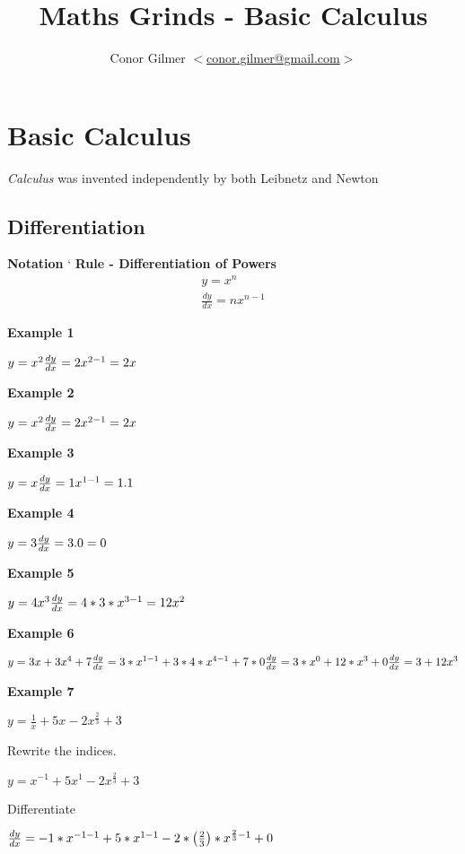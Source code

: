 \documentclass{article}
\title{\gmat{} Maths Grinds - Basic Calculus}
\author{Conor Gilmer $<$\href{mailto:conor.gilmer@gmail.com}{conor.gilmer@gmail.com}$>$}
\begin{document}
\section{Basic Calculus}
\textit{Calculus} was invented independently by both Leibnetz and Newton
\subsection{Differentiation}
\textbf{Notation}
`
\textbf{Rule - Differentiation of Powers}
\begin{equation}
\begin{split}
y = x^{n} \\
\frac{dy}{dx} = nx^{n-1}
\end{split}
\end{equation}




\textbf{Example 1}

$y = x^{2}\\
\frac{dy}{dx} = 2x^{2-1} = 2x
$


\textbf{Example 2}

$y = x^{2}\\
\frac{dy}{dx} = 2x^{2-1} = 2x
$


\textbf{Example 3}

$y = x\\
\frac{dy}{dx} = 1x^{1-1} = 1.1
$

\textbf{Example 4}

$y = 3\\
\frac{dy}{dx} = 3.0 = 0
$

\textbf{Example 5}

$y = 4x^{3}\\
\frac{dy}{dx} = 4*3*x^{3-1} = 12x^{2}
$


\textbf{Example 6}

$y = 3x + 3x^{4} + 7\\
\frac{dy}{dx} = 3*x^{1-1} + 3*4*x^{4-1} + 7 * 0 \\
\frac{dy}{dx} = 3*x^{0} + 12*x^{3} + 0\\
\frac{dy}{dx} = 3 + 12x^{3} \\
$

\textbf{Example 7}

$y = \frac{1}{x} + 5x - 2x^{\frac{2}{3}} + 3$

Rewrite the indices.

$y = x^{-1} +  5x^{1} - 2x^{\frac{2}{3}} + 3$

Differentiate

$\frac{dy}{dx} = -1*x^{-1-1} +5*x^{1-1} - 2 * \left(\frac{2}{3}\right) * x^{\frac{2}{3} - 1}   + 0 \\
$
\end{document}
